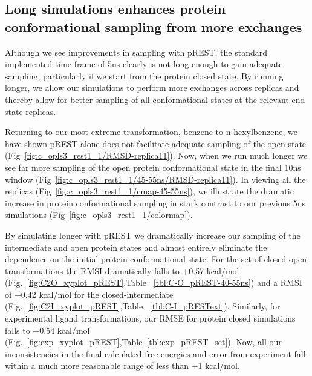 \documentclass[journal=jctcce,manuscript=article]{achemso}
\begin{document}
\subsection*{Long simulations enhances protein conformational sampling from more exchanges}
Although we see improvements in sampling with pREST, the standard implemented time frame of 5ns clearly is not long enough to gain adequate sampling, particularly if we start from the protein closed state.
By running longer, we allow our simulations to perform more exchanges across replicas and thereby allow for better sampling of all conformational states at the relevant end state replicas.

Returning to our most extreme transformation, benzene to n-hexylbenzene, we have shown pREST alone does not facilitate adequate sampling of the open state (Fig~\ref{fig:c_opls3_rest1_1/RMSD-replica11}).
Now, when we run much longer we see far more sampling of the open protein conformational state in the final 10ns window (Fig~\ref{fig:c_opls3_rest1_1/45-55ns/RMSD-replica11}).\footnotemark
In viewing all the replicas (Fig~\ref{fig:c_opls3_rest1_1/cmap-45-55ns}), we illustrate the dramatic increase in protein conformational sampling in stark contrast to our previous 5ns simulations (Fig~\ref{fig:c_opls3_rest1_1/colormap}). 

By simulating longer with pREST we dramatically increase our sampling of the intermediate and open protein states and almost entirely eliminate the dependence on the initial protein conformational state.
For the set of closed-open transformations the RMSI dramatically falls to +0.57 kcal/mol (Fig.~\ref{fig:C2O_xyplot_pREST},Table ~\ref{tbl:C-O_pREST-40-55ns}) and a RMSI of +0.42 kcal/mol for the closed-intermediate (Fig.~\ref{fig:C2I_xyplot_pREST},Table ~\ref{tbl:C-I_pRESText}).
Similarly, for experimental ligand transformations, our RMSE for protein closed simulations falls to +0.54 kcal/mol (Fig.~\ref{fig:exp_xyplot_pREST},Table~\ref{tbl:exp_pREST_set}).
Now, all our inconsistencies in the final calculated free energies and error from experiment fall within a much more reasonable range of less than +1 kcal/mol.
 
\end{document}
